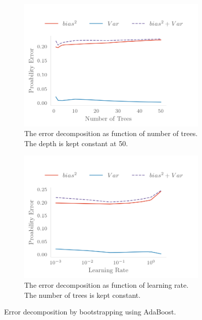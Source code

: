 \begin{figure}[H]
    \begin{subfigure}
        \centering
        \includegraphics{Figures/ada_biasvar.png}
        \caption{The error decomposition
        as function of number of trees. The depth is kept constant
        at 50.}
    \end{subfigure}
    \begin{subfigure}
        \centering
        \includegraphics{Figures/ada_lr_biasvar.png}
        \caption{The error decomposition
        as function of learning rate. The number of trees is kept
        constant.}
    \end{subfigure}
    \caption{Error decomposition by bootstrapping using AdaBoost.}
    \label{fig:adaboost_err}
\end{figure}

